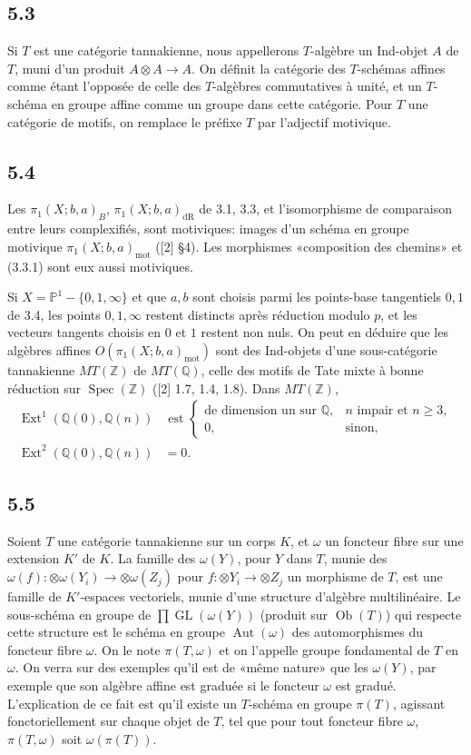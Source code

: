 \documentclass[10pt]{article}
\newcommand{\Q}{\mathbb Q}
\newcommand{\Z}{\mathbb Z}
\newcommand{\PP}{\mathbb P}
\newcommand{\Spec}{\operatorname{Spec}}
\newcommand{\Ext}{\operatorname{Ext}}
\newcommand{\Aut}{\operatorname{Aut}}
\newcommand{\GL}{\operatorname{GL}}
\newcommand{\Ob}{\operatorname{Ob}}
\newcommand{\dR}{\mathrm{dR}}
\newcommand{\mot}{\mathrm{mot}}
\begin{document}
\subsection*{5.3}
Si $T$ est une catégorie tannakienne, nous appellerons $T$-algèbre un Ind-objet $A$ de $T$, muni d'un produit $A\otimes A\to A$. On définit la catégorie des $T$-schémas affines comme étant l'opposée de celle des $T$-algèbres commutatives à unité, et un $T$-schéma en groupe affine comme un groupe dans cette catégorie. Pour $T$ une catégorie de motifs, on remplace le préfixe $T$ par l'adjectif motivique.

\subsection*{5.4}
Les $\pi_1(X;b,a)_B$, $\pi_1(X;b,a)_{\dR}$ de 3.1, 3.3, et l'isomorphisme de comparaison entre leurs complexifiés, sont motiviques: images d'un schéma en groupe motivique $\pi_1(X;b,a)_{\mot}$ ([2] \S4). Les morphismes «composition des chemins» et (3.3.1) sont eux aussi motiviques.

Si $X=\PP^1-\{0,1,\infty\}$ et que $a,b$ sont choisis parmi les points-base tangentiels $0,1$ de 3.4, les points $0,1,\infty$ restent distincts après réduction modulo $p$, et les vecteurs tangents choisis en $0$ et $1$ restent non nuls. On peut en déduire que les algèbres affines $O(\pi_1(X;b,a)_{\mot})$ sont des Ind-objets d'une sous-catégorie tannakienne $MT(\Z)$ de $MT(\Q)$, celle des motifs de Tate mixte à bonne réduction sur $\Spec(\Z)$ ([2] 1.7, 1.4, 1.8). Dans $MT(\Z)$,
\begin{align}
\Ext^1(\Q(0),\Q(n))&\text{ est }
\begin{cases}
\text{de dimension un sur }\Q, & n\text{ impair et }n\geq3,\\
0, & \text{sinon,}
\end{cases}
\tag{5.4.1}\\
\Ext^2(\Q(0),\Q(n))&=0.
\tag{5.4.2}
\end{align}

\subsection*{5.5}
Soient $T$ une catégorie tannakienne sur un corps $K$, et $\omega$ un foncteur fibre sur une extension $K'$ de $K$. La famille des $\omega(Y)$, pour $Y$ dans $T$, munie des $\omega(f):\otimes\omega(Y_i)\to\otimes\omega(Z_j)$ pour $f:\otimes Y_i\to\otimes Z_j$ un morphisme de $T$, est une famille de $K'$-espaces vectoriels, munie d'une structure d'algèbre multilinéaire. Le sous-schéma en groupe de $\prod\GL(\omega(Y))$ (produit sur $\Ob(T)$) qui respecte cette structure est le schéma en groupe $\Aut(\omega)$ des automorphismes du foncteur fibre $\omega$. On le note $\pi(T,\omega)$ et on l'appelle groupe fondamental de $T$ en $\omega$. On verra sur des exemples qu'il est de «même nature» que les $\omega(Y)$, par exemple que son algèbre affine est graduée si le foncteur $\omega$ est gradué. L'explication de ce fait est qu'il existe un $T$-schéma en groupe $\pi(T)$, agissant fonctoriellement sur chaque objet de $T$, tel que pour tout foncteur fibre $\omega$, $\pi(T,\omega)$ soit $\omega(\pi(T))$.
\end{document}
